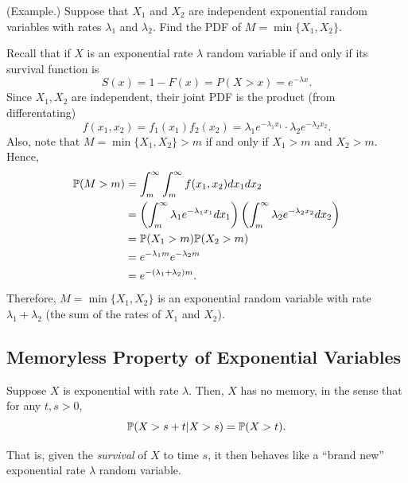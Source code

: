 \begin{mdframed}[]
    (Example.) Suppose that $X_1$ and $X_2$ are independent exponential random variables with rates $\lambda_1$ and $\lambda_2$. Find the PDF of $M = \min\{X_1, X_2\}$. 

    \begin{mdframed}[]
        Recall that if $X$ is an exponential rate $\lambda$ random variable if and only if its survival function is 
        \[S(x) = 1 - F(x) = P(X > x) = e^{-\lambda x}.\]
        Since $X_1, X_2$ are independent, their joint PDF is the product (from differentating)
        \[f(x_1, x_2) = f_{1}(x_1) f_{2}(x_2) = \lambda_1 e^{-\lambda_1 x_1} \cdot \lambda_2 e^{-\lambda_2 x_2}.\]
        Also, note that $M = \min\{X_1, X_2\} > m$ if and only if $X_1 > m$ and $X_2 > m$. Hence,
        \begin{equation*}
            \begin{aligned}
                \mathbb{P}(M > m) &= \int_{m}^{\infty} \int_{m}^{\infty} f(x_1, x_2) dx_1 dx_2 \\ 
                    &= \left(\int_{m}^{\infty} \lambda_1 e^{-\lambda_1 x_1} dx_1\right) \left(\int_{m}^{\infty} \lambda_2 e^{-\lambda_2 x_2} dx_2\right) \\ 
                    &= \mathbb{P}(X_1 > m) \mathbb{P}(X_2 > m) \\ 
                    &= e^{-\lambda_1 m} e^{-\lambda_2 m} \\ 
                    &= e^{-(\lambda_1 + \lambda_2)m}.
            \end{aligned}
        \end{equation*}
        Therefore, $M = \min\{X_1, X_2\}$ is an exponential random variable with rate $\lambda_1 + \lambda_2$ (the sum of the rates of $X_1$ and $X_2$). 
    \end{mdframed}
\end{mdframed}

\subsection{Memoryless Property of Exponential Variables}
\begin{theorem}{}{}
    Suppose $X$ is exponential with rate $\lambda$. Then, $X$ has no memory, in the sense that for any $t, s > 0$, 
    \[\mathbb{P}(X > s + t | X > s) = \mathbb{P}(X > t).\]
\end{theorem}
That is, given the \emph{survival} of $X$ to time $s$, it then behaves like a ``brand new'' exponential rate $\lambda$ random variable. 

